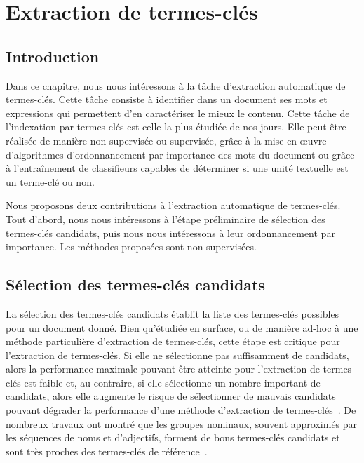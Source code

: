 \chapter{Extraction de termes-clés}
\label{chap:main-domain_independent_keyphrase_extraction}


  \section{Introduction}
  \label{sec:main:domain_independent_keyphrase_extraction-introduction}
    Dans ce chapitre, nous nous intéressons à la tâche d'extraction automatique
    de termes-clés. Cette tâche consiste à identifier dans un document ses mots
    et expressions qui permettent d'en caractériser le mieux le contenu. Cette
    tâche de l'indexation par termes-clés est celle la plus étudiée de nos
    jours. Elle peut être réalisée de manière non supervisée ou supervisée,
    grâce à la mise en \oe{}uvre d'algorithmes d'ordonnancement par importance
    des mots du document ou grâce à l'entraînement de classifieurs capables de
    déterminer si une unité textuelle est un terme-clé ou non.

    Nous proposons deux contributions à l'extraction automatique de termes-clés.
    Tout d'abord, nous nous intéressons à l'étape préliminaire de sélection des
    termes-clés candidats, puis nous nous intéressons à leur ordonnancement par
    importance. Les méthodes proposées sont non supervisées.


  \section{Sélection des termes-clés candidats}
  \label{sec:main:domain_independent_keyphrase_extraction-keyphrase_candidate_selection}
    La sélection des termes-clés candidats établit la liste des termes-clés
    possibles pour un document donné. Bien qu'étudiée en surface, ou de manière
    ad-hoc à une méthode particulière d'extraction de termes-clés, cette étape
    est critique pour l'extraction de termes-clés. Si elle ne sélectionne pas
    suffisamment de candidats, alors la performance maximale pouvant être
    atteinte pour l'extraction de termes-clés est faible et, au contraire, si
    elle sélectionne un nombre important de candidats, alors elle augmente le
    risque de sélectionner de mauvais candidats pouvant dégrader la performance
    d'une méthode d'extraction de termes-clés~\cite{hasan2014state_of_the_art}.
    De nombreux travaux ont montré que les groupes nominaux, souvent
    approximés par les séquences de noms et d'adjectifs, forment de bons
    termes-clés candidats et sont très proches des termes-clés de
    référence~\cite{barker2000nounphrasehead,hulth2003keywordextraction,wan2008expandrank}.

